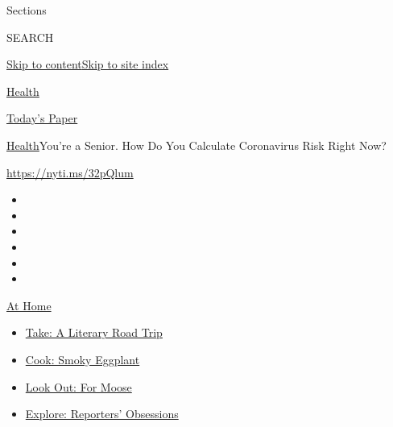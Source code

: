 Sections

SEARCH

\protect\hyperlink{site-content}{Skip to
content}\protect\hyperlink{site-index}{Skip to site index}

\href{https://www.nytimes3xbfgragh.onion/section/health}{Health}

\href{https://myaccount.nytimes3xbfgragh.onion/auth/login?response_type=cookie\&client_id=vi}{}

\href{https://www.nytimes3xbfgragh.onion/section/todayspaper}{Today's
Paper}

\href{/section/health}{Health}\textbar{}You're a Senior. How Do You
Calculate Coronavirus Risk Right Now?

\url{https://nyti.ms/32pQlum}

\begin{itemize}
\item
\item
\item
\item
\item
\item
\end{itemize}

\href{https://www.nytimes3xbfgragh.onion/spotlight/at-home?action=click\&pgtype=Article\&state=default\&region=TOP_BANNER\&context=at_home_menu}{At
Home}

\begin{itemize}
\tightlist
\item
  \href{https://www.nytimes3xbfgragh.onion/2020/07/28/books/time-for-a-literary-road-trip.html?action=click\&pgtype=Article\&state=default\&region=TOP_BANNER\&context=at_home_menu}{Take:
  A Literary Road Trip}
\item
  \href{https://www.nytimes3xbfgragh.onion/2020/07/29/magazine/bored-with-your-home-cooking-some-smoky-eggplant-will-fix-that.html?action=click\&pgtype=Article\&state=default\&region=TOP_BANNER\&context=at_home_menu}{Cook:
  Smoky Eggplant}
\item
  \href{https://www.nytimes3xbfgragh.onion/2020/07/27/travel/moose-michigan-isle-royale.html?action=click\&pgtype=Article\&state=default\&region=TOP_BANNER\&context=at_home_menu}{Look
  Out: For Moose}
\item
  \href{https://www.nytimes3xbfgragh.onion/interactive/2020/at-home/even-more-reporters-editors-diaries-lists-recommendations.html?action=click\&pgtype=Article\&state=default\&region=TOP_BANNER\&context=at_home_menu}{Explore:
  Reporters' Obsessions}
\end{itemize}

